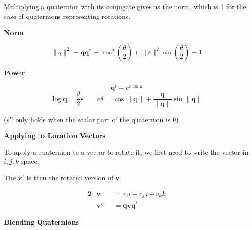 \documentclass{article}
\begin{document}
Multiplying a quaternion with its conjugate gives us the norm, which is 1 for the case of
quaternions representing rotations.

\vspace{5px}

\textbf{Norm}

\[
    \lVert q \rVert^2 = \mathbf{q}\mathbf{q}^* = \cos^2 \left(\frac{\theta}{2}\right) + 
    \lVert \mathbf{s} \rVert^2 \sin\left(\frac{\theta}{2}\right) = 1
\]






\textbf{Power}

\vspace{5px}

\[
    \mathbf{q}^t = e^{t \log \mathbf{q}}
\]
\[
    \log \mathbf{q} = \frac{\theta}{2} \mathbf{s} \qquad e^\mathbf{q} = \cos \lVert \mathbf{q} \rVert
    + \frac{\mathbf{q}}{\lVert \mathbf{q} \rVert }  \sin \lVert \mathbf{q} \rVert 
\]
\begin{center}
    (\(e^{\mathbf{q}}\) only holds when the scalar part of the quaternion is 0)
\end{center}

\textbf{Applying to Location Vectors}

\vspace{5px}

To apply a quaternion to a vector to rotate it, we first need to write the vector in \(i,j,k\) space.

The \(\mathbf{v}'\) is then the rotated version of \(\mathbf{v}\)

\begin{alignat*}{2}
    &\mathbf{v} &&= v_i i + v_j j + v_k k \\
    &\mathbf{v}' &&= \mathbf{qvq}^* 
\end{alignat*}

\textbf{Blending Quaternions}

\vspace{5px}
\end{document}
